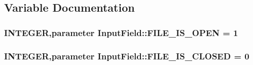 \subsection{Variable Documentation}
\hypertarget{namespace_input_field_ac271f9951500fb53f89b59f48c60e4d9}{
\subsubsection[{FILE\_\-IS\_\-OPEN}]{\setlength{\rightskip}{0pt plus 5cm}INTEGER,parameter {\bf InputField::FILE\_\-IS\_\-OPEN} = 1}}
\label{namespace_input_field_ac271f9951500fb53f89b59f48c60e4d9}
\hypertarget{namespace_input_field_a1408d7aae417ece86cc598019d1e5ff9}{
\subsubsection[{FILE\_\-IS\_\-CLOSED}]{\setlength{\rightskip}{0pt plus 5cm}INTEGER,parameter {\bf InputField::FILE\_\-IS\_\-CLOSED} = 0}}
\label{namespace_input_field_a1408d7aae417ece86cc598019d1e5ff9}
